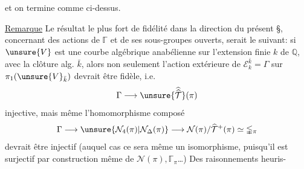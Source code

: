 et on termine comme ci-dessus.

\uline{Remarque} Le résultat le plus fort de
fidélité dans la direction du présent
\S, concernant des actions de $\mathbb{\Gamma}$ et de
ses sous-groupes ouverts, serait le
suivant: si $\unsure{V}$ est une courbe
algébrique anabélienne sur l'extension
finie $k$ de $\mathbb Q$, avec la clôture alg. $\bar k$,
alors non seulement l'action extérieure
de $\mathcal E_k^{\bar k}=\Gamma$ sur
$\pi_1(\unsure{V}_{\bar k})$ devrait être
fidèle, i.e.
\[
\Gamma\longrightarrow\unsure{\widehat{\widehat{\mathcal T}}}(\pi)
\]
injective, mais même l'homomorphisme
composé
\[
\Gamma\longrightarrow
\unsure{\mathcal N_4(\pi)|\mathcal N_{\Delta}(\pi)}
\longrightarrow\mathcal N(\pi)/\widehat{\mathcal T}^{+}(\pi)
\simeq\mathbb{\Gamma}_{\pi}
\]
devrait être injectif (auquel cas ce sera
même un isomorphisme, puisqu'il est
surjectif par construction même de
$\mathcal N(\pi),\mathbb{\Gamma}_{\pi}$\ldots)
Des raisonnements heuris-

